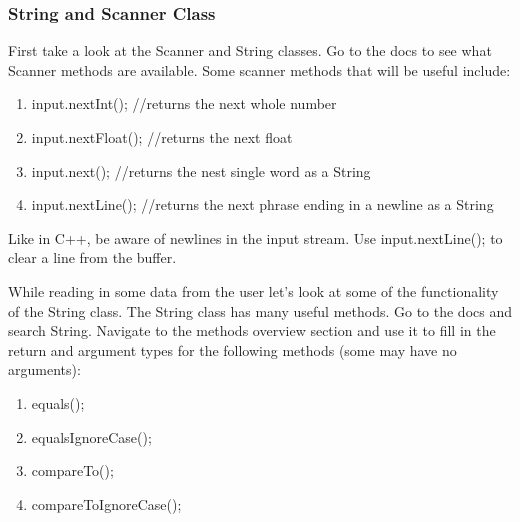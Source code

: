 \documentclass[../../main.tex]{subfiles}
\begin{document}
\subsubsection{String and Scanner Class}
\begin{steps}
      \item First take a look at the Scanner and String classes. Go to the
         docs to see what Scanner methods are available. Some scanner methods
         that will be useful include: 
         \begin{enumerate}[label=\Alph*.]
            \item input.nextInt();     //returns the next whole number
            \item input.nextFloat();   //returns the next float
            \item input.next();        //returns the nest single word as a String
            \item input.nextLine();    //returns the next phrase ending in a newline as a String
         \end{enumerate}
      \item Like in C++, be aware of newlines in the input stream.
         Use input.nextLine(); to clear a line from the buffer.
      \item While reading in some data from the user let's look at some of the functionality of
         the String class. The String class has many useful methods. Go to the docs and search
         String. Navigate to the methods overview section and use it to fill in the return and
         argument types for the following methods (some may have no arguments):
   \begin{enumerate}[label=\Alph*.]
      \item \vspace{.5cm}\underline{\hspace{4cm}}equals(\underline{\hspace{4cm}});
      \item \vspace{.5cm}\underline{\hspace{4cm}}equalsIgnoreCase(\underline{\hspace{4cm}});
      \item \vspace{.5cm}\underline{\hspace{4cm}}compareTo(\underline{\hspace{4cm}});
      \item \vspace{.5cm}\underline{\hspace{4cm}}compareToIgnoreCase(\underline{\hspace{4cm}});

\end{enumerate}
\end{steps}
\end{document}
